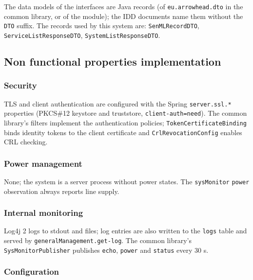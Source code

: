 \documentclass[a4paper]{arrowhead}
\begin{document}
The data models of the interfaces are Java records (of \texttt{eu.arrowhead.dto} in the common library, or of the module); the IDD documents name them without the \texttt{DTO} suffix. The records used by this system are: \texttt{SenMLRecordDTO}, \texttt{Service\allowbreak{}List\allowbreak{}Response\allowbreak{}DTO}, \texttt{System\allowbreak{}List\allowbreak{}Response\allowbreak{}DTO}.

\subsection{Non functional properties implementation}

\subsubsection{Security}

TLS and client authentication are configured with the Spring \texttt{server.\allowbreak{}ssl.\allowbreak{}*} properties (PKCS\#12 keystore and truststore, \texttt{client-\allowbreak{}auth=\allowbreak{}need}). The common library's filters implement the authentication policies; \texttt{Token\allowbreak{}Certificate\allowbreak{}Binding} binds identity tokens to the client certificate and \texttt{Crl\allowbreak{}Revocation\allowbreak{}Config} enables CRL checking.

\subsubsection{Power management}

None; the system is a server process without power states. The \texttt{sysMonitor} \texttt{power} observation always reports line supply.

\subsubsection{Internal monitoring}

Log4j 2 logs to stdout and files; log entries are also written to the \texttt{logs} table and served by \texttt{general\allowbreak{}Management.\allowbreak{}get-\allowbreak{}log}. The common library's \texttt{Sys\allowbreak{}Monitor\allowbreak{}Publisher} publishes \texttt{echo}, \texttt{power} and \texttt{status} every 30 s.

\subsubsection{Configuration}
\end{document}
